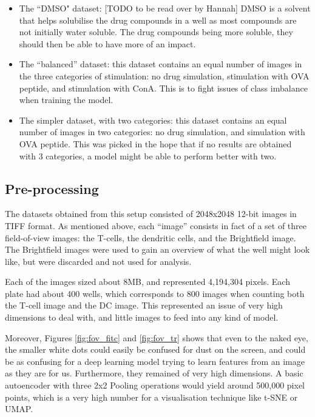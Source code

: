 \begin{itemize}
    \item The ``DMSO" dataset: [TODO to be read over by Hannah] DMSO is a solvent that helps solubilise the drug compounds in a well as most compounds are not initially water soluble. The drug compounds being more soluble, they should then be able to have more of an impact. 
    \item The ``balanced” dataset: this dataset contains an equal number of images in the three categories of stimulation: no drug simulation, stimulation with OVA peptide, and stimulation with ConA. This is to fight issues of class imbalance when training the model. 
    \item The simpler dataset, with two categories: this  dataset contains an equal number of images in two categories: no drug simulation, and simulation with OVA peptide. This was picked in the hope that if no results are obtained with 3 categories, a model might be able to perform better with two. 
\end{itemize}

\subsection{Pre-processing}
The datasets obtained from this setup consisted of 2048x2048 12-bit images in TIFF format. As mentioned above, each ``image” consists in fact of a set of three field-of-view images: the T-cells, the dendritic cells, and the Brightfield image. The Brightfield images were used to gain an overview of what the well might look like, but were discarded and not used for analysis. 

Each of the images sized about 8MB, and represented 4,194,304 pixels. Each plate had about 400 wells, which corresponds to 800 images when counting both the T-cell image and the DC image. This represented an issue of very high dimensions to deal with, and little images to feed into any kind of model. 

Moreover, Figures \ref{fig:fov_fitc} and \ref{fig:fov_tr} shows that even to the naked eye, the smaller white dots could easily be confused for dust on the screen, and could be as confusing for a deep learning model trying to learn features from an image as they are for us. Furthermore, they remained of very high dimensions. A basic autoencoder with three 2x2 Pooling operations would yield around 500,000 pixel points, which is a very high number for a visualisation technique like t-SNE or UMAP. 

